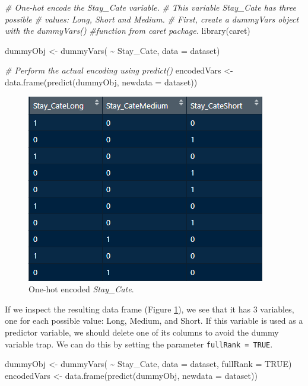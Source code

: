 \documentclass[
  11pt,
]{krantz}
\newenvironment{Shaded}{\begin{snugshade}}{\end{snugshade}}
\newcommand{\AttributeTok}[1]{\textcolor[rgb]{0.61,0.61,0.61}{#1}}
\newcommand{\CommentTok}[1]{\textcolor[rgb]{0.37,0.37,0.37}{\textit{#1}}}
\newcommand{\ConstantTok}[1]{\textcolor[rgb]{0,0,0}{#1}}
\newcommand{\FunctionTok}[1]{\textcolor[rgb]{0,0,0}{#1}}
\newcommand{\NormalTok}[1]{#1}
\newcommand{\OtherTok}[1]{\textcolor[rgb]{0.37,0.37,0.37}{#1}}
\newcommand{\SpecialCharTok}[1]{\textcolor[rgb]{0,0,0}{#1}}
\begin{document}
\begin{Shaded}
\begin{Highlighting}[]
\CommentTok{\# One{-}hot encode the Stay\_Cate variable.}
\CommentTok{\# This variable Stay\_Cate has three possible}
\CommentTok{\# values: Long, Short and Medium.}
\CommentTok{\# First, create a dummyVars object with the dummyVars()}
\CommentTok{\#function from caret package.}
\FunctionTok{library}\NormalTok{(caret)}

\NormalTok{dummyObj }\OtherTok{\textless{}{-}} \FunctionTok{dummyVars}\NormalTok{( }\SpecialCharTok{\textasciitilde{}}\NormalTok{ Stay\_Cate, }\AttributeTok{data =}\NormalTok{ dataset)}

\CommentTok{\# Perform the actual encoding using predict()}
\NormalTok{encodedVars }\OtherTok{\textless{}{-}} \FunctionTok{data.frame}\NormalTok{(}\FunctionTok{predict}\NormalTok{(dummyObj,}
                                  \AttributeTok{newdata =}\NormalTok{ dataset))}
\end{Highlighting}
\end{Shaded}



\begin{figure}

{\centering \includegraphics[width=0.5\linewidth]{images/stay_cate_1} 

}

\caption{One-hot encoded \emph{Stay\_Cate}.}\label{fig:stayCate1}
\end{figure}

If we inspect the resulting data frame (Figure \ref{fig:stayCate1}), we see that it has \(3\) variables, one for each possible value: Long, Medium, and Short. If this variable is used as a predictor variable, we should delete one of its columns to avoid the dummy variable trap. We can do this by setting the parameter \texttt{fullRank\ =\ TRUE}.

\begin{Shaded}
\begin{Highlighting}[]
\NormalTok{dummyObj }\OtherTok{\textless{}{-}} \FunctionTok{dummyVars}\NormalTok{( }\SpecialCharTok{\textasciitilde{}}\NormalTok{ Stay\_Cate, }\AttributeTok{data =}\NormalTok{ dataset, }\AttributeTok{fullRank =} \ConstantTok{TRUE}\NormalTok{)}
\NormalTok{encodedVars }\OtherTok{\textless{}{-}} \FunctionTok{data.frame}\NormalTok{(}\FunctionTok{predict}\NormalTok{(dummyObj, }\AttributeTok{newdata =}\NormalTok{ dataset))}
\end{Highlighting}
\end{Shaded}
\end{document}
